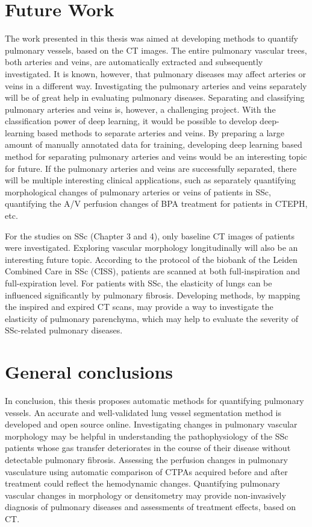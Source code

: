\section{Future Work}

The work presented in this thesis was aimed at developing methods to quantify pulmonary vessels, based on the CT images. The entire pulmonary vascular trees, both arteries and veins, are automatically extracted and subsequently investigated. It is known, however, that pulmonary diseases may affect arteries or veins in a different way. Investigating the pulmonary arteries and veins separately will be of great help in evaluating pulmonary diseases. Separating and classifying pulmonary arteries and veins is, however, a challenging project. With the classification power of deep learning, it would be possible to develop deep-learning based methods to separate arteries and veins. By preparing a large amount of manually annotated data for training, developing deep learning based method for separating pulmonary arteries and veins would be an interesting topic for future. If the pulmonary arteries and veins are successfully separated, there will be multiple interesting clinical applications, such as separately quantifying morphological changes of pulmonary arteries or veins of patients in SSc, quantifying the A/V perfusion changes of BPA treatment for patients in CTEPH, etc.

For the studies on SSc (Chapter 3 and 4), only baseline CT images of patients were investigated. Exploring vascular morphology longitudinally will also be an interesting future topic. According to the protocol of the biobank of the Leiden Combined Care in SSc (CISS), patients are scanned at both full-inspiration and full-expiration level. For patients with SSc, the elasticity of lungs can be influenced significantly by pulmonary fibrosis. Developing methods, by mapping the inspired and expired CT scans, may provide a way to investigate the elasticity of pulmonary parenchyma, which may help to evaluate the severity of SSc-related pulmonary diseases.

\section{General conclusions}
In conclusion, this thesis proposes automatic methods for quantifying pulmonary vessels. An accurate and well-validated lung vessel segmentation method is developed and open source online. Investigating changes in pulmonary vascular morphology may be helpful in understanding the pathophysiology of the SSc patients whose gas transfer deteriorates in the course of their disease without detectable pulmonary fibrosis. Assessing the perfusion changes in pulmonary vasculature using automatic comparison of CTPAs acquired before and after treatment could reflect the hemodynamic changes. Quantifying pulmonary vascular changes in morphology or densitometry may provide non-invasively diagnosis of pulmonary diseases and assessments of treatment effects, based on CT.

 

